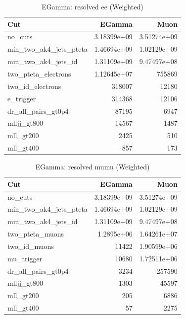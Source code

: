 \documentclass{article}
\begin{document}
\begin{table}[htbp]
\centering
\caption{EGamma: resolved ee (Weighted)}
\begin{tabular}{lrr}
\hline
Cut & EGamma & Muon \\
\hline
no\_cuts & 3.18399e+09 & 3.51274e+09 \\
min\_two\_ak4\_jets\_pteta & 1.46694e+09 & 1.02129e+09 \\
min\_two\_ak4\_jets\_id & 1.31109e+09 & 9.47497e+08 \\
two\_pteta\_electrons & 1.12645e+07 & 755869 \\
two\_id\_electrons & 318007 & 12180 \\
e\_trigger & 314368 & 12106 \\
dr\_all\_pairs\_gt0p4 & 87195 & 6947 \\
mlljj\_gt800 & 14567 & 1487 \\
mll\_gt200 & 2425 & 510 \\
mll\_gt400 & 857 & 173 \\
\hline
\end{tabular}
\end{table}

\begin{table}[htbp]
\centering
\caption{EGamma: resolved mumu (Weighted)}
\begin{tabular}{lrr}
\hline
Cut & EGamma & Muon \\
\hline
no\_cuts & 3.18399e+09 & 3.51274e+09 \\
min\_two\_ak4\_jets\_pteta & 1.46694e+09 & 1.02129e+09 \\
min\_two\_ak4\_jets\_id & 1.31109e+09 & 9.47497e+08 \\
two\_pteta\_muons & 1.2895e+06 & 1.64261e+07 \\
two\_id\_muons & 11422 & 1.90599e+06 \\
mu\_trigger & 10680 & 1.72511e+06 \\
dr\_all\_pairs\_gt0p4 & 3234 & 257590 \\
mlljj\_gt800 & 1303 & 45597 \\
mll\_gt200 & 205 & 6886 \\
mll\_gt400 & 57 & 2275 \\
\hline
\end{tabular}
\end{table}
\end{document}
